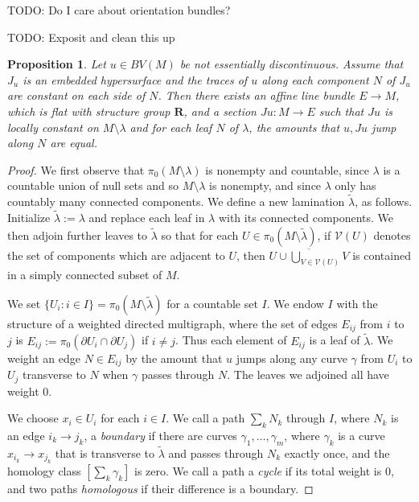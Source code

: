 \documentclass[reqno,10pt]{amsart}
\newcommand{\RR}{\mathbf{R}}
\newcommand{\dfn}[1]{\emph{#1}\index{#1}}
\newtheorem{proposition}[theorem]{Proposition}
\theoremstyle{definition}
\numberwithin{equation}{section}
\begin{document}
TODO: Do I care about orientation bundles?

TODO: Exposit and clean this up

\begin{proposition}\label{existence of jump graphs}
Let $u \in BV(M)$ be not essentially discontinuous.
Assume that $J_u$ is an embedded hypersurface and the traces of $u$ along each component $N$ of $J_u$ are constant on each side of $N$.
Then there exists an affine line bundle $E \to M$, which is flat with structure group $\RR$, and a section $Ju: M \to E$ such that $Ju$ is locally constant on $M \setminus \lambda$ and for each leaf $N$ of $\lambda$, the amounts that $u, Ju$ jump along $N$ are equal.
\end{proposition}
\begin{proof}
We first observe that $\pi_0(M \setminus \lambda)$ is nonempty and countable, since $\lambda$ is a countable union of null sets and so $M \setminus \lambda$ is nonempty, and since $\lambda$ only has countably many connected components.
We define a new lamination $\tilde \lambda$, as follows. Initialize $\tilde \lambda := \lambda$ and replace each leaf in $\lambda$ with its connected components.
We then adjoin further leaves to $\tilde \lambda$ so that for each $U \in \pi_0(M \setminus \tilde \lambda)$, if $\mathcal V(U)$ denotes the set of components which are adjacent to $U$, then $\overline{U \cup \bigcup_{V \in \mathcal V(U)} V}$ is contained in a simply connected subset of $M$.

We set $\{U_i: i \in I\} = \pi_0(M \setminus \tilde \lambda)$ for a countable set $I$.
We endow $I$ with the structure of a weighted directed multigraph, where the set of edges $E_{ij}$ from $i$ to $j$ is $E_{ij} := \pi_0(\partial U_i \cap \partial U_j)$ if $i \neq j$.
Thus each element of $E_{ij}$ is a leaf of $\tilde \lambda$.
We weight an edge $N \in E_{ij}$ by the amount that $u$ jumps along any curve $\gamma$ from $U_i$ to $U_j$ transverse to $N$ when $\gamma$ passes through $N$.
The leaves we adjoined all have weight $0$.

We choose $x_i \in U_i$ for each $i \in I$.
We call a path $\sum_k N_k$ through $I$, where $N_k$ is an edge $i_k \to j_k$, a \dfn{boundary} if there are curves $\gamma_1, \dots, \gamma_m$, where $\gamma_k$ is a curve $x_{i_k} \to x_{j_k}$ that is transverse to $\tilde \lambda$ and passes through $N_k$ exactly once, and the homology class $[\sum_k \gamma_k]$ is zero.
We call a path a \dfn{cycle} if its total weight is $0$, and two paths \dfn{homologous} if their difference is a boundary.


\end{proof}
\end{document}
